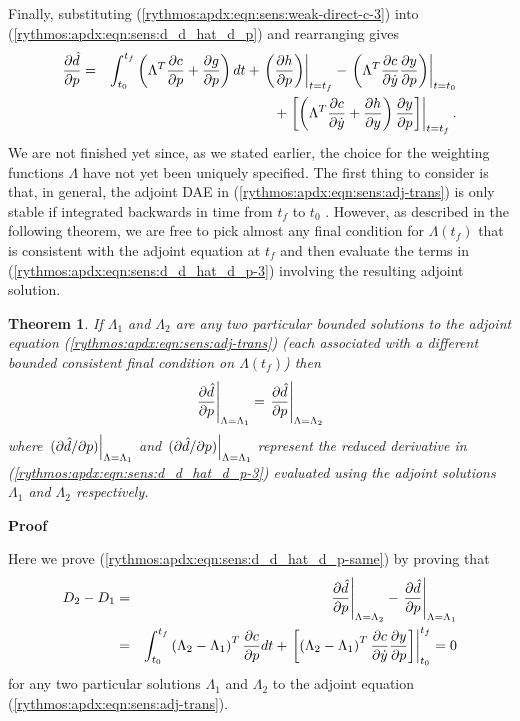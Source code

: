 \documentclass[pdf,ps2pdf,11pt]{SANDreport}
\newtheorem{theorem}{Theorem}
\begin{document}
Finally, substituting (\ref{rythmos:apdx:eqn:sens:weak-direct-c-3}) into
(\ref{rythmos:apdx:eqn:sens:d_d_hat_d_p}) and rearranging gives
%
\begin{eqnarray}
\displaystyle{\frac{\partial \hat{d}}{\partial p}} 
& = & \int_{t_0}^{t_f} \left( \Lambda^T \displaystyle{\frac{\partial c}{\partial p}} + \displaystyle{\frac{\partial g}{\partial p}} \right) dt
  + \left. \left( \displaystyle{\frac{\partial h}{\partial p}} \right) \right|_{t=t_f}
  - \left. \left( \Lambda^T \displaystyle{\frac{\partial c}{\partial \dot{y}}} \displaystyle{\frac{\partial y}{\partial p}} \right) \right|_{t=t_0}
\nonumber \\
& & + \left. \left[ \left(
    \Lambda^T \displaystyle{\frac{\partial c}{\partial \dot{y}}}
    +  \displaystyle{\frac{\partial h}{\partial y}}
  \right)  \displaystyle{\frac{\partial y}{\partial p}} \right] \right|_{t=t_f}.
\label{rythmos:apdx:eqn:sens:d_d_hat_d_p-3}
\end{eqnarray}
%
We are not finished yet since, as we stated earlier, the choice for the
weighting functions $\Lambda$ have not yet been uniquely specified.  The first
thing to consider is that, in general, the adjoint DAE in
(\ref{rythmos:apdx:eqn:sens:adj-trans}) is only stable if integrated backwards
in time from $t_f$ to $t_0$ {}\cite{adjoint-sens-2003}.  However, as described
in the following theorem, we are free to pick almost any final condition for
$\Lambda(t_f)$ that is consistent with the adjoint equation at $t_f$ and then
evaluate the terms in (\ref{rythmos:apdx:eqn:sens:d_d_hat_d_p-3}) involving
the resulting adjoint solution.

\begin{theorem}
If $\Lambda_1$ and $\Lambda_2$ are any two particular bounded solutions to the
adjoint equation (\ref{rythmos:apdx:eqn:sens:adj-trans}) (each associated with
a different bounded consistent final condition on $\Lambda(t_f)$) then
%
\begin{equation}
\left.\displaystyle{\frac{\partial \hat{d}}{\partial p}}\right|_{\Lambda=\Lambda_1} = \left.\displaystyle{\frac{\partial \hat{d}}{\partial p}}\right|_{\Lambda=\Lambda_2}
\label{rythmos:apdx:eqn:sens:d_d_hat_d_p-same}
\end{equation}
%
where $\left.(\partial \hat{d} / \partial p)\right|_{\Lambda=\Lambda_1}$ and
$\left.(\partial \hat{d} / \partial p)\right|_{\Lambda=\Lambda_1}$ represent the reduced
derivative in (\ref{rythmos:apdx:eqn:sens:d_d_hat_d_p-3}) evaluated using the
adjoint solutions $\Lambda_1$ and $\Lambda_2$ respectively.
\end{theorem}

\textbf{Proof}

Here we prove (\ref{rythmos:apdx:eqn:sens:d_d_hat_d_p-same}) by proving that
%
\begin{eqnarray}
D_2 - D_1
& = &
\left.\displaystyle{\frac{\partial \hat{d}}{\partial p}}\right|_{\Lambda=\Lambda_2} - \left.\displaystyle{\frac{\partial \hat{d}}{\partial p}}\right|_{\Lambda=\Lambda_1}
\nonumber \\
& = &
\int_{t_0}^{t_f} \left( \Lambda_2 - \Lambda_1 \right)^T \displaystyle{\frac{\partial c}{\partial p}} dt
+ \left.\left[ \left( \Lambda_2 - \Lambda_1 \right)^T \displaystyle{\frac{\partial c}{\partial \dot{y}}} \displaystyle{\frac{\partial y}{\partial p}} \right]\right|_{t_0}^{t_f}
= 0
\label{rythmos:apdx:eqn:sens:ta:d_hat_d_d_p-diff-zero}
\end{eqnarray}
%
for any two particular solutions $\Lambda_1$ and $\Lambda_2$ to the adjoint
equation (\ref{rythmos:apdx:eqn:sens:adj-trans}).
\end{document}
